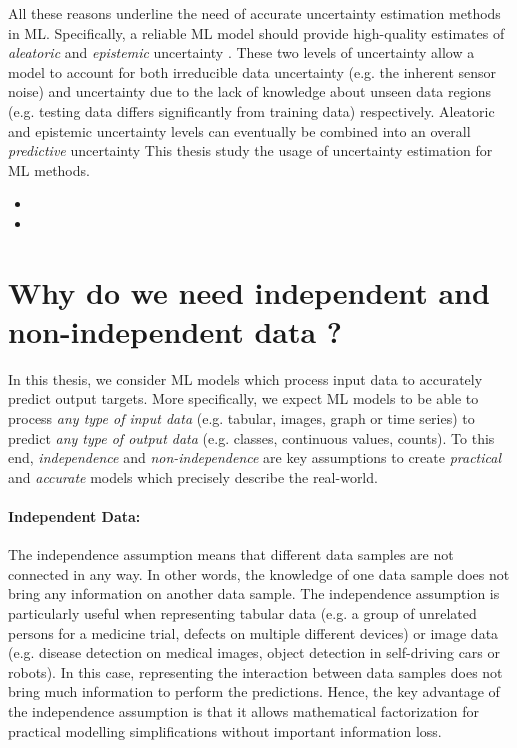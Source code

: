 All these reasons underline the need of accurate uncertainty estimation methods in ML. 
Specifically, a reliable ML model should provide high-quality estimates of \emph{aleatoric} and \emph{epistemic} uncertainty \citep{dropout}.
These two levels of uncertainty allow a model to account for both irreducible data uncertainty (e.g. the inherent sensor noise) and uncertainty due to the lack of knowledge about unseen data regions (e.g. testing data differs significantly from training data) respectively.
Aleatoric and epistemic uncertainty levels can eventually be combined into an overall \emph{predictive} uncertainty \citep{dropout}
This thesis study the usage of uncertainty estimation for ML methods.

\begin{itemize}
    \item {}
    \item {}
\end{itemize}

\section{Why do we need independent and non-independent data ?}

In this thesis, we consider ML models which process input data to accurately predict output targets. 
More specifically, we expect ML models to be able to process \emph{any type of input data} (e.g. tabular, images, graph or time series) to predict \emph{any type of output data} (e.g. classes, continuous values, counts).
To this end, \emph{independence} and \emph{non-independence} are key assumptions to create \emph{practical} and \emph{accurate} models which precisely describe the real-world. 

\paragraph*{Independent Data:} The independence assumption means that different data samples are not connected in any way. In other words, the knowledge of one data sample does not bring any information on another data sample.
The independence assumption is particularly useful when representing tabular data (e.g. a group of unrelated persons for a medicine trial, defects on multiple different devices) or image data (e.g. disease detection on medical images, object detection in self-driving cars or robots).
In this case, representing the interaction between data samples does not bring much information to perform the predictions.
Hence, the key advantage of the independence assumption is that it allows mathematical factorization for practical modelling simplifications \citep{bishop} without important information loss.

